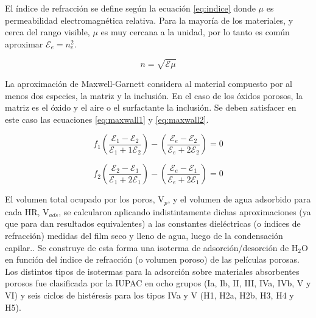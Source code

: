 		\vspace*{2mm}El índice de refracción se define según la ecuación \ref{eq:indice} donde $\mu$ es permeabilidad electromagnética relativa. Para la mayoría de los materiales, y cerca del rango visible, $\mu$ es muy cercana a la unidad, por lo tanto es común aproximar $\mathcal{E}_e=n_e^2$.
		
						\begin{equation}
					 	   n=\sqrt{\mathcal{E}\mu}
					 	   \label{eq:indice}
						\end{equation}
		
		\vspace*{2mm}La aproximación de Maxwell-Garnett considera al material compuesto por al menos dos especies, la matriz y la inclusión. En el caso de los óxidos porosos, la matriz es el óxido y el aire o el surfactante la inclusión. Se deben satisfacer en este caso las ecuaciones \ref{eq:maxwall1} y \ref{eq:maxwall2}.
				
							\begin{equation}
					 		   	 f_1\left(\frac{\mathcal{E}_1-\mathcal{E}_2}{\mathcal{E}_1+1\mathcal{E}_2}\right)-
					 		   	 \left(\frac{\mathcal{E}_e-\mathcal{E}_2}{\mathcal{E}_e+2\mathcal{E}_2}\right)=0
					 		     \label{eq:maxwall1}
								\end{equation}
						
								\begin{equation}
					 		   	 f_2\left(\frac{\mathcal{E}_2-\mathcal{E}_1}{\mathcal{E}_1+2\mathcal{E}_1}\right)-
					 		   	 \left(\frac{\mathcal{E}_e-\mathcal{E}_1}{\mathcal{E}_e+2\mathcal{E}_1}\right)=0
					 		     \label{eq:maxwall2}
								\end{equation}
		
		\vspace*{2mm}El volumen total ocupado por los poros, V$_p$, y el volumen de agua adsorbido para cada HR, V$_{ads}$, se calcularon aplicando indistintamente dichas aproximaciones (ya que para \pdm\space dan resultados equivalentes) a las constantes dieléctricas (o índices de refracción) medidas del film seco y lleno de agua, luego de la condensación capilar.\cite{Angelome2008,Fuertes2009,Nano-compuestas2013}. Se construye de esta forma una isoterma de adsorción/desorción de H$_2$O en función del índice de refracción (o volumen poroso) de las películas porosas. Los distintos tipos de isotermas para la adsorción sobre materiales absorbentes porosos fue clasificada por la IUPAC en ocho grupos (Ia, Ib, II, III, IVa, IVb, V y VI) y seis ciclos de histéresis para los tipos IVa y V (H1, H2a, H2b, H3, H4 y H5). \cite{Thommes2015}

